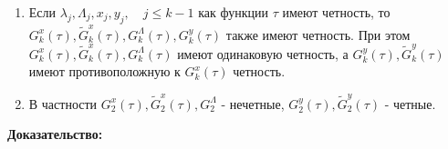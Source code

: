 \begin{utv}
\begin{enumerate}

\item 
Если $\lambda_j,\Lambda_j,x_j,y_j, \quad j \le k-1$ как функции $\tau$ имеют четность, то \newline $G_k^x(\tau),\tilde G_k^x(\tau),G_k^\Lambda(\tau), G_k^y(\tau)$ также имеют четность. При этом $G_k^x(\tau),\tilde G_k^x(\tau),G_k^\Lambda(\tau)$ имеют одинаковую четность, а $G_k^y(\tau), \tilde G_k^y(\tau)$ имеют противоположную к $G_k^x(\tau)$ четность. 

\item В частности $G_2^x(\tau), \tilde G_2^x(\tau), G_2^\Lambda$ - нечетные, $G_2^y(\tau), \tilde G_2^y(\tau)$ - четные.
\end{enumerate}
\end{utv}
\textbf{Доказательство:}\nopagebreak[4]
